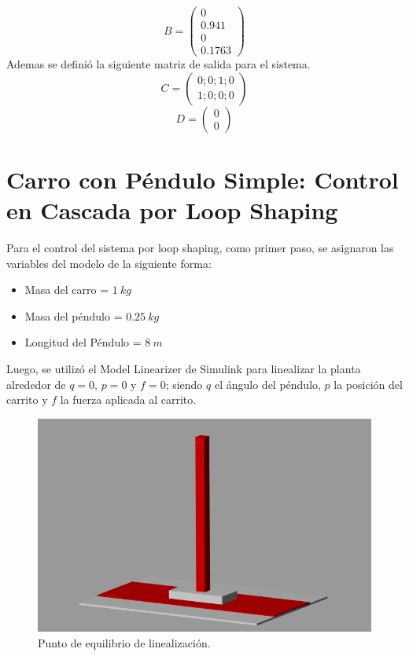 \begin{equation*}
B = 
\begin{pmatrix}
0  \\
0.941  \\
0   \\
0.1763  
\end{pmatrix}
\end{equation*}
Ademas se definió la siguiente matriz de salida para el sistema.
\begin{equation*}
C = 
\begin{pmatrix}
0 ; 0; 1 ; 0 \\
1 ; 0; 0 ; 0 
\end{pmatrix}
\end{equation*}
\begin{equation*}
D = 
\begin{pmatrix}
0 \\
0 
\end{pmatrix}
\end{equation*}

\section{Carro con Péndulo Simple: Control en Cascada por Loop Shaping}

Para el control del sistema por loop shaping, como primer paso, se asignaron las variables del modelo de la siguiente forma:

\begin{itemize}
\item Masa del carro = $1 \ kg$
\item Masa del péndulo = $0.25 \ kg$
\item Longitud del Péndulo = $8 \ m$
\end{itemize}

Luego, se utilizó el Model Linearizer de Simulink para linealizar la planta alrededor de $q=0$, $p=0$ y $f=0$; siendo $q$ el ángulo del péndulo, $p$ la posición del carrito y $f$ la fuerza aplicada al carrito.

\begin{figure}[H]
	\centering
	\includegraphics[width=0.5\linewidth]{Imagenes/loopshaping/equilibrio}
	\caption{Punto de equilibrio de linealización.}
	\label{1_equilibrio}
\end{figure}

